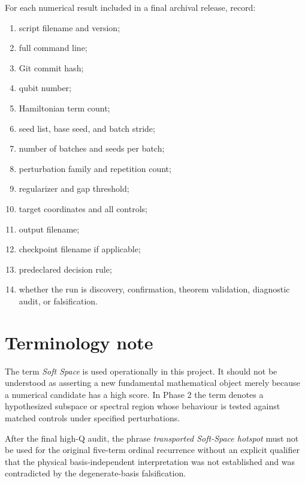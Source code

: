 \documentclass[11pt,a4paper]{article}
\begin{document}
For each numerical result included in a final archival release, record:

\begin{enumerate}[label=\arabic*.]
\item script filename and version;
\item full command line;
\item Git commit hash;
\item qubit number;
\item Hamiltonian term count;
\item seed list, base seed, and batch stride;
\item number of batches and seeds per batch;
\item perturbation family and repetition count;
\item regularizer and gap threshold;
\item target coordinates and all controls;
\item output filename;
\item checkpoint filename if applicable;
\item predeclared decision rule;
\item whether the run is discovery, confirmation, theorem validation,
      diagnostic audit, or falsification.
\end{enumerate}

\section{Terminology note}

The term \emph{Soft Space} is used operationally in this project.  It should
not be understood as asserting a new fundamental mathematical object merely
because a numerical candidate has a high score.  In Phase 2 the term denotes
a hypothesized subspace or spectral region whose behaviour is tested against
matched controls under specified perturbations.

After the final high-Q audit, the phrase \emph{transported Soft-Space hotspot}
must not be used for the original five-term ordinal recurrence without an
explicit qualifier that the physical basis-independent interpretation was
not established and was contradicted by the degenerate-basis falsification.
\end{document}
